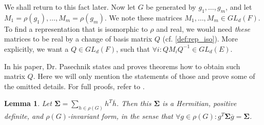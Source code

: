 \documentclass[11pt]{article}
\newtheorem{lemma}[theorem]{Lemma}
\begin{document}
We shall return to this fact later. Now let $G$ be generated by $g_1, \ldots, g_m$, and let $M_1 = \rho(g_1), \ldots, M_m = \rho(g_m)$.
We note these matrices $M_1, \ldots, M_m \in GL_d(F)$. To find a representation that is isomorphic to
$\rho$ and real, we would need \textit{these} matrices to be real by a change of basis matrix $Q$ (cf. \cref{def:rep_iso}).
More explicitly, we want a $Q \in GL_d(F)$, such that $\forall i: QM_iQ^{-1} \in GL_d(E)$.

In his paper, Dr. Pasechnik states and proves theorems how to obtain such matrix $Q$.
Here we will only mention the statements of those and prove some of the omitted details. For full proofs, refer to \cite[Lemma 3.1, 3.2]{Pas21}.
\begin{lemma}
  Let $\mathbf{\Sigma} = \sum_{h \in \rho(G)} h^T\overline{h}$. Then this $\mathbf{\Sigma}$ is a Hermitian,
  positive definite, and $\rho(G)$-invariant form, in the sense that
  $\forall g \in \rho(G): g^T\mathbf{\Sigma}\overline{g} = \mathbf{\Sigma}$.
\end{lemma}
\end{document}
